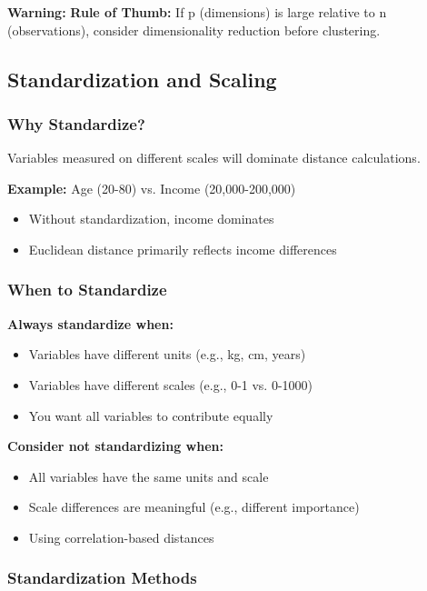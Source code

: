 \documentclass[
]{article}
\begin{document}
\textbf{Warning: } \textbf{Rule of Thumb:} If p (dimensions) is large
relative to n (observations), consider dimensionality reduction before
clustering.

\textbf{ }

\subsection{Standardization and Scaling}

\subsubsection{Why Standardize?}

Variables measured on different scales will dominate distance
calculations.

\textbf{Example:} Age (20-80) vs. Income (20,000-200,000)

\begin{itemize}
\item
  Without standardization, income dominates
\item
  Euclidean distance primarily reflects income differences
\end{itemize}

\subsubsection{When to Standardize}

\textbf{Always standardize when:}

\begin{itemize}
\item
  Variables have different units (e.g., kg, cm, years)
\item
  Variables have different scales (e.g., 0-1 vs. 0-1000)
\item
  You want all variables to contribute equally
\end{itemize}

\textbf{Consider not standardizing when:}

\begin{itemize}
\item
  All variables have the same units and scale
\item
  Scale differences are meaningful (e.g., different importance)
\item
  Using correlation-based distances
\end{itemize}

\subsubsection{Standardization Methods}
\end{document}
